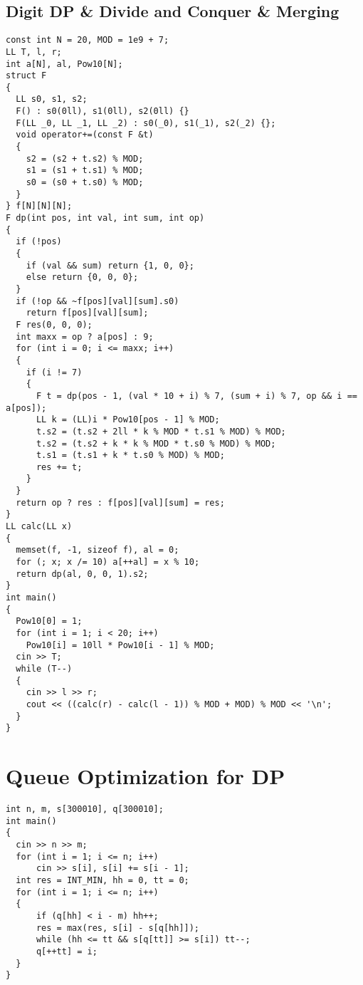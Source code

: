 \subsection{Digit DP \& Divide and Conquer \& Merging}
\begin{lstlisting}
const int N = 20, MOD = 1e9 + 7;
LL T, l, r;
int a[N], al, Pow10[N];
struct F
{
  LL s0, s1, s2;
  F() : s0(0ll), s1(0ll), s2(0ll) {}
  F(LL _0, LL _1, LL _2) : s0(_0), s1(_1), s2(_2) {};
  void operator+=(const F &t)
  {
    s2 = (s2 + t.s2) % MOD;
    s1 = (s1 + t.s1) % MOD;
    s0 = (s0 + t.s0) % MOD;
  }
} f[N][N][N];
F dp(int pos, int val, int sum, int op)
{
  if (!pos)
  {
    if (val && sum) return {1, 0, 0};
    else return {0, 0, 0};
  }
  if (!op && ~f[pos][val][sum].s0)
    return f[pos][val][sum];
  F res(0, 0, 0);
  int maxx = op ? a[pos] : 9;
  for (int i = 0; i <= maxx; i++)
  {
    if (i != 7)
    {
      F t = dp(pos - 1, (val * 10 + i) % 7, (sum + i) % 7, op && i == a[pos]);
      LL k = (LL)i * Pow10[pos - 1] % MOD;
      t.s2 = (t.s2 + 2ll * k % MOD * t.s1 % MOD) % MOD;
      t.s2 = (t.s2 + k * k % MOD * t.s0 % MOD) % MOD;
      t.s1 = (t.s1 + k * t.s0 % MOD) % MOD;
      res += t;
    }
  }
  return op ? res : f[pos][val][sum] = res;
}
LL calc(LL x)
{
  memset(f, -1, sizeof f), al = 0;
  for (; x; x /= 10) a[++al] = x % 10;
  return dp(al, 0, 0, 1).s2;
}
int main()
{
  Pow10[0] = 1;
  for (int i = 1; i < 20; i++)
    Pow10[i] = 10ll * Pow10[i - 1] % MOD;
  cin >> T;
  while (T--)
  {
    cin >> l >> r;
    cout << ((calc(r) - calc(l - 1)) % MOD + MOD) % MOD << '\n';
  }
}
\end{lstlisting}
\section{Queue Optimization for DP}
\begin{lstlisting}
int n, m, s[300010], q[300010];
int main()
{
  cin >> n >> m;
  for (int i = 1; i <= n; i++)
      cin >> s[i], s[i] += s[i - 1];
  int res = INT_MIN, hh = 0, tt = 0;
  for (int i = 1; i <= n; i++)
  {
      if (q[hh] < i - m) hh++;
      res = max(res, s[i] - s[q[hh]]);
      while (hh <= tt && s[q[tt]] >= s[i]) tt--;
      q[++tt] = i;
  }
}
\end{lstlisting}
